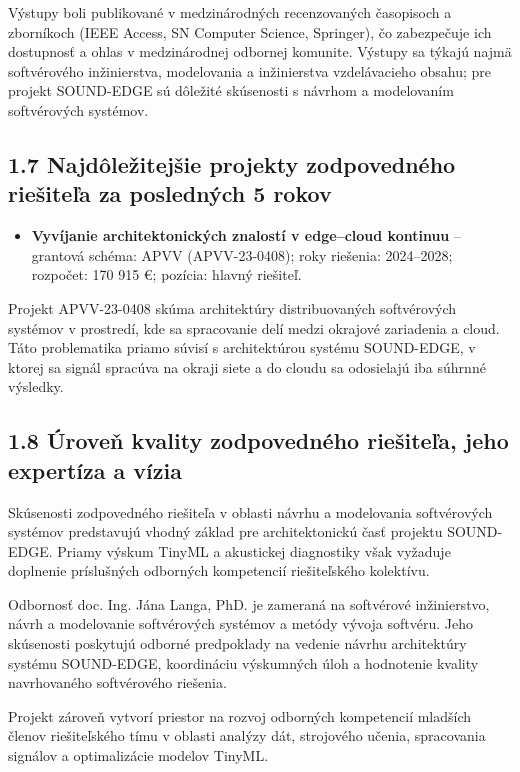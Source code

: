 \documentclass[10pt,a4paper]{article}
\begin{document}
Výstupy boli publikované v medzinárodných recenzovaných časopisoch a zborníkoch (IEEE Access, SN Computer Science, Springer), čo zabezpečuje ich dostupnosť a ohlas v medzinárodnej odbornej komunite. Výstupy sa týkajú najmä softvérového inžinierstva, modelovania a inžinierstva vzdelávacieho obsahu; pre projekt SOUND-EDGE sú dôležité skúsenosti s návrhom a modelovaním softvérových systémov.

\subsection*{1.7 Najdôležitejšie projekty zodpovedného
riešiteľa za posledných 5 rokov}

\begin{itemize}[leftmargin=1.5em, itemsep=2pt, topsep=2pt]
\item \textbf{Vyvíjanie architektonických znalostí v edge–cloud kontinuu} -- grantová schéma: APVV (APVV-23-0408); roky riešenia: 2024--2028; rozpočet: 170 915 €; pozícia: hlavný riešiteľ.
\end{itemize}

Projekt APVV-23-0408 skúma architektúry distribuovaných softvérových systémov v prostredí, kde sa spracovanie delí medzi okrajové zariadenia a cloud. Táto problematika priamo súvisí s architektúrou systému SOUND-EDGE, v ktorej sa signál spracúva na okraji siete a do cloudu sa odosielajú iba súhrnné výsledky.

\subsection*{1.8 Úroveň kvality zodpovedného riešiteľa,
jeho expertíza a vízia}

Skúsenosti zodpovedného riešiteľa v oblasti návrhu a modelovania softvérových systémov predstavujú vhodný základ pre architektonickú časť projektu SOUND-EDGE. Priamy výskum TinyML a akustickej diagnostiky však vyžaduje doplnenie príslušných odborných kompetencií riešiteľského kolektívu.

Odbornosť doc. Ing. Jána Langa, PhD. je zameraná na softvérové inžinierstvo, návrh a modelovanie softvérových systémov a metódy vývoja softvéru. Jeho skúsenosti poskytujú odborné predpoklady na vedenie návrhu architektúry systému SOUND-EDGE, koordináciu výskumných úloh a hodnotenie kvality navrhovaného softvérového riešenia.

Projekt zároveň vytvorí priestor na rozvoj odborných kompetencií mladších členov riešiteľského tímu v oblasti analýzy dát, strojového učenia, spracovania signálov a optimalizácie modelov TinyML.
\end{document}
